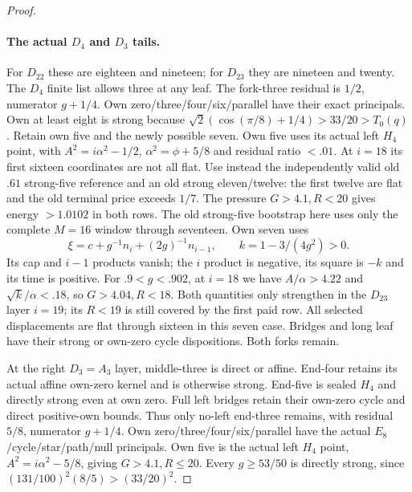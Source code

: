 \documentclass[11pt]{article}
\theoremstyle{definition}
\theoremstyle{remark}
\begin{document}
\begin{proof}
\paragraph{The actual $D_4$ and $D_3$ tails.}
For $D_{22}$ these are eighteen and nineteen; for $D_{23}$ they
are nineteen and twenty. The $D_4$ finite list allows three at any
leaf. The fork-three residual is $1/2$, numerator $g+1/4$.
Own zero/three/four/six/parallel have their exact principals.
Own at least eight is strong because
$\sqrt2(\cos(\pi/8)+1/4)>33/20>T_0(q)$.
Retain own five and the newly possible seven. Own five uses its
actual left $H_4$ point, with $A^2=i\alpha^2-1/2$,
$\alpha^2=\phi+5/8$ and residual ratio $<.01$.
At $i=18$ its first sixteen coordinates are not all flat.
Use instead the independently valid old $.61$ strong-five reference
and an old strong eleven/twelve: the first twelve are flat and the
old terminal price exceeds $1/7$. The pressure $G>4.1,R<20$ gives
energy $>1.0102$ in both rows. The old strong-five bootstrap here
uses only the complete $M=16$ window through seventeen.
Own seven uses
\[
 \xi=c+g^{-1}n_i+(2g)^{-1}n_{i-1},\qquad k=1-3/(4g^2)>0.
\]
Its cap and $i-1$ products vanish; the $i$ product is negative,
its square is $-k$ and its time is positive. For $.9<g<.902$,
at $i=18$ we have $A/\alpha>4.22$ and
$\sqrt{k}/\alpha<.18$, so $G>4.04,R<18$. Both quantities
only strengthen in the $D_{23}$ layer $i=19$; its $R<19$ is
still covered by the first paid row. All selected displacements
are flat through sixteen in this seven case. Bridges and long leaf
have their strong or own-zero cycle dispositions. Both forks remain.

At the right $D_3=A_3$ layer, middle-three is direct or affine.
End-four retains its actual affine own-zero kernel and is otherwise
strong. End-five is sealed $H_4$ and directly strong even at own
zero. Full left bridges retain their own-zero cycle and direct
positive-own bounds. Thus only no-left end-three remains, with
residual $5/8$, numerator $g+1/4$. Own zero/three/four/six/parallel
have the actual $E_8$/cycle/star/path/null principals. Own five is
the actual left $H_4$ point, $A^2=i\alpha^2-5/8$, giving
$G>4.1,R\le20$. Every $g\ge53/50$ is directly strong, since
$(131/100)^2(8/5)>(33/20)^2$.


\end{proof}
\end{document}

